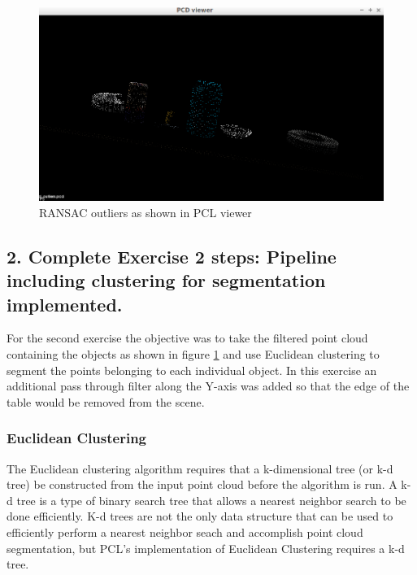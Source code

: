 \documentclass{article}
\begin{document}
\begin{figure}[H]
    \includegraphics[width=\linewidth]{ex1extractedoutliers.png}
    \caption{RANSAC outliers as shown in PCL viewer}
    \label{fig:outliers}
\end{figure}

\subsection{2. Complete Exercise 2 steps: Pipeline including clustering for segmentation implemented.}
For the second exercise the objective was to take the filtered point cloud containing the objects as shown in figure \ref{fig:outliers} and use Euclidean clustering to segment the points belonging to each individual object. In this exercise an additional pass through filter along the Y-axis was added so that the edge of the table would be removed from the scene.

\subsubsection{Euclidean Clustering}
The Euclidean clustering algorithm requires that a k-dimensional tree (or k-d tree) be constructed from the input point cloud before the algorithm is run. A k-d tree is a type of binary search tree that allows a nearest neighbor search to be done efficiently. K-d trees are not the only data structure that can be used to efficiently perform a nearest neighbor seach and accomplish point cloud segmentation, but PCL's implementation of Euclidean Clustering requires a k-d tree.
\end{document}
